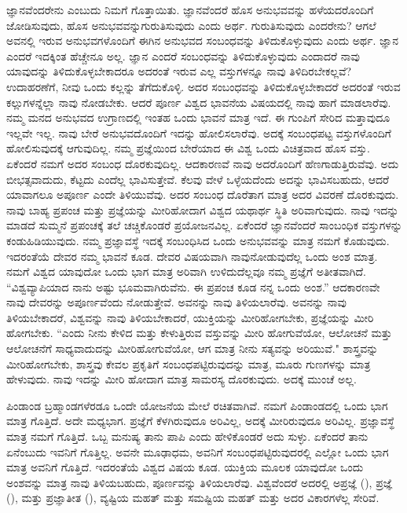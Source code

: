 ಜ್ಞಾನವೆಂದರೇನು ಎಂಬುದು ನಿಮಗೆ ಗೊತ್ತಾಯಿತು. ಜ್ಞಾನವೆಂದರೆ ಹೊಸ ಅನುಭವವನ್ನು ಹಳೆಯದರೊಂದಿಗೆ ಜೋಡಿಸುವುದು, ಹೊಸ ಅನುಭವವನ್ನು\break ಗುರುತಿಸುವುದು ಎಂದು ಅರ್ಥ. ಗುರುತಿಸುವುದು ಎಂದರೇನು? ಆಗಲೆ ಅವನಲ್ಲಿ ಇರುವ ಅನುಭವಗಳೊಂದಿಗೆ ಈಗಿನ ಅನುಭವದ ಸಂಬಂಧವನ್ನು ತಿಳಿದುಕೊಳ್ಳುವುದು ಎಂದು ಅರ್ಥ. ಜ್ಞಾನ ಎಂದರೆ ಇದಕ್ಕಿಂತ ಹೆಚ್ಚೇನೂ ಅಲ್ಲ. ಜ್ಞಾನ ಎಂದರೆ ಸಂಬಂಧವನ್ನು ತಿಳಿದುಕೊಳ್ಳುವುದು ಎಂದಾದರೆ ನಾವು ಯಾವುದನ್ನು ತಿಳಿದುಕೊಳ್ಳಬೇಕಾದರೂ ಅದರಂತೆ ಇರುವ ಎಲ್ಲ ವಸ್ತುಗಳನ್ನೂ ನಾವು ತಿಳಿದಿರಬೇಕಲ್ಲವೆ? ಉದಾಹರಣೆಗೆ, ನೀವು ಒಂದು ಕಲ್ಲನ್ನು ತೆಗೆದುಕೊಳ್ಳಿ. ಅದರ ಸಂಬಂಧವನ್ನು ತಿಳಿದುಕೊಳ್ಳಬೇಕಾದರೆ ಅದರಂತೆ ಇರುವ ಕಲ್ಲುಗಳನ್ನೆಲ್ಲಾ ನಾವು ನೋಡಬೇಕು. ಆದರೆ ಪೂರ್ಣ ವಿಶ್ವದ ಭಾವನೆಯ ವಿಷಯದಲ್ಲಿ ನಾವು ಹಾಗೆ ಮಾಡಲಾರೆವು. ನಮ್ಮ ಮನದ ಅನುಭವದ ಉಗ್ರಾಣದಲ್ಲಿ ಇಂತಹ ಒಂದು ಭಾವನೆ ಮಾತ್ರ ಇದೆ. ಈ ಗುಂಪಿಗೆ ಸೇರಿದ ಮತ್ತಾವುದೂ ಇಲ್ಲವೇ ಇಲ್ಲ. ನಾವು ಬೇರೆ ಅನುಭವದೊಂದಿಗೆ ಇದನ್ನು ಹೋಲಿಸಲಾರೆವು. ಅದಕ್ಕೆ ಸಂಬಂಧಪಟ್ಟ ವಸ್ತುಗಳೊಂದಿಗೆ ಹೋಲಿಸುವುದಕ್ಕೆ ಆಗುವುದಿಲ್ಲ. ನಮ್ಮ ಪ್ರಜ್ಞೆಯಿಂದ ಬೇರೆಯಾದ ಈ ವಿಶ್ವ ಒಂದು ವಿಚಿತ್ರವಾದ ಹೊಸ ವಸ್ತು. ಏಕೆಂದರೆ ನಮಗೆ ಅದರ ಸಂಬಂಧ ದೊರಕುವುದಿಲ್ಲ. ಆದಕಾರಣವೆ ನಾವು ಅದರೊಂದಿಗೆ ಹೆಣಗಾಡುತ್ತಿರುವೆವು. ಅದು ಬೀಭತ್ಸವಾದುದು, ಕೆಟ್ಟದು ಎಂದೆಲ್ಲ ಭಾವಿಸುತ್ತೇವೆ. ಕೆಲವು ವೇಳೆ ಒಳ್ಳೆಯದೆಂದು ಅದನ್ನು ಭಾವಿಸಬಹುದು, ಆದರೆ ಯಾವಾಗಲೂ ಅಪೂರ್ಣ ಎಂದೇ ತಿಳಿಯುವೆವು. ಅದರ ಸಂಬಂಧ ದೊರೆತಾಗ ಮಾತ್ರ ಅದರ ವಿವರಣೆ ದೊರಕುವುದು. ನಾವು ಬಾಹ್ಯ ಪ್ರಪಂಚ ಮತ್ತು ಪ್ರಜ್ಞೆಯನ್ನು ಮೀರಿಹೋದಾಗ ವಿಶ್ವದ ಯಥಾರ್ಥ ಸ್ಥಿತಿ ಅರಿವಾಗುವುದು. ನಾವು ಇದನ್ನು ಮಾಡದೆ ಸುಮ್ಮನೆ ಪ್ರಪಂಚಕ್ಕೆ ತಲೆ ಚಚ್ಚಿಕೊಂಡರೆ ಪ್ರಯೋಜನವಿಲ್ಲ. ಏಕೆಂದರೆ ಜ್ಞಾನವೆಂದರೆ ಸಾಂಬಂಧಿಕ ವಸ್ತುಗಳನ್ನು ಕಂಡುಹಿಡಿಯುವುದು. ನಮ್ಮ ಪ್ರಜ್ಞಾವಸ್ಥೆ ಇದಕ್ಕೆ ಸಂಬಂಧಿಸಿದ ಒಂದು ಅನುಭವವನ್ನು ಮಾತ್ರ ನಮಗೆ ಕೊಡುವುದು. ಇದರಂತೆಯೆ ದೇವರ ನಮ್ಮ ಭಾವನೆ ಕೂಡ. ದೇವರ ವಿಷಯವಾಗಿ ನಾವು\break ನೋಡುವುದೆಲ್ಲ ಒಂದು ಅಂಶ ಮಾತ್ರ. ನಮಗೆ ವಿಶ್ವದ ಯಾವುದೋ ಒಂದು ಭಾಗ ಮಾತ್ರ ಅರಿವಾಗಿ ಉಳಿದುದೆಲ್ಲವೂ ನಮ್ಮ ಪ್ರಜ್ಞೆಗೆ ಅತೀತವಾಗಿದೆ. “ವಿಶ್ವವ್ಯಾಪಿಯಾದ ನಾನು ಅಷ್ಟು ಭೂಮವಾಗಿರುವೆನು. ಈ ಪ್ರಪಂಚ ಕೂಡ ನನ್ನ ಒಂದು ಅಂಶ.'' ಆದಕಾರಣವೇ ನಾವು ದೇವರನ್ನು ಅಪೂರ್ಣವೆಂದು ನೋಡುತ್ತೇವೆ. ಅವನನ್ನು ನಾವು ತಿಳಿಯಲಾರೆವು. ಅವನನ್ನು ನಾವು ತಿಳಿಯಬೇಕಾದರೆ, ವಿಶ್ವವನ್ನು ನಾವು ತಿಳಿಯಬೇಕಾದರೆ, ಯುಕ್ತಿಯನ್ನು ಮೀರಿಹೋಗಬೇಕು, ಪ್ರಜ್ಞೆಯನ್ನು ಮೀರಿ ಹೋಗಬೇಕು. “ಎಂದು ನೀನು ಕೇಳಿದ ಮತ್ತು ಕೇಳುತ್ತಿರುವ ವಸ್ತುವನ್ನು ಮೀರಿ ಹೋಗುವೆಯೋ, ಆಲೋಚನೆ ಮತ್ತು ಆಲೋಚನೆಗೆ ಸಾಧ್ಯವಾದುದನ್ನು ಮೀರಿಹೋಗುವೆಯೋ, ಆಗ ಮಾತ್ರ ನೀನು ಸತ್ಯವನ್ನು ಅರಿಯುವೆ." ಶಾಸ್ತ್ರವನ್ನು ಮೀರಿಹೋಗಬೇಕು, ಶಾಸ್ತ್ರವು ಕೇವಲ ಪ್ರಕೃತಿಗೆ ಸಂಬಂಧಪಟ್ಟಿರುವುದನ್ನು ಮಾತ್ರ, ಮೂರು ಗುಣಗಳನ್ನು ಮಾತ್ರ ಹೇಳುವುದು. ನಾವು ಇದನ್ನು ಮೀರಿ ಹೋದಾಗ ಮಾತ್ರ ಸಾಮರಸ್ಯ ದೊರಕುವುದು. ಅದಕ್ಕೆ ಮುಂಚೆ ಅಲ್ಲ.

ಪಿಂಡಾಂಡ ಬ್ರಹ್ಮಾಂಡಗಳೆರಡೂ ಒಂದೇ ಯೋಜನೆಯ ಮೇಲೆ ರಚಿತವಾಗಿವೆ. ನಮಗೆ ಪಿಂಡಾಂಡದಲ್ಲಿ ಒಂದು ಭಾಗ ಮಾತ್ರ ಗೊತ್ತಿದೆ. ಅದೇ ಮಧ್ಯಭಾಗ. ಪ್ರಜ್ಞೆಗೆ ಕೆಳಗಿರುವುದೂ ಅರಿವಿಲ್ಲ, ಅದಕ್ಕೆ ಮೀರಿರುವುದೂ ಅರಿವಿಲ್ಲ. ಪ್ರಜ್ಞಾವಸ್ಥೆ ಮಾತ್ರ ನಮಗೆ ಗೊತ್ತಿದೆ. ಒಬ್ಬ ಮನುಷ್ಯ ತಾನು ಪಾಪಿ ಎಂದು ಹೇಳಿಕೊಂಡರೆ ಅದು ಸುಳ್ಳು. ಏಕೆಂದರೆ ತಾನು ಏನೆಂಬುದು ಇವನಿಗೆ ಗೊತ್ತಿಲ್ಲ. ಅವನೇ ಮೂಢಾಧಮ, ಅವನಿಗೆ ಸಂಬಂಧಪಟ್ಟಿರುವುದರಲ್ಲಿ ಎಲ್ಲೋ ಒಂದು ಭಾಗ ಮಾತ್ರ ಅವನಿಗೆ ಗೊತ್ತಿದೆ. ಇದರಂತೆಯೆ ವಿಶ್ವದ ವಿಷಯ ಕೂಡ. ಯುಕ್ತಿಯ ಮೂಲಕ ಯಾವುದೋ ಒಂದು ಅಂಶವನ್ನು ಮಾತ್ರ ನಾವು ತಿಳಿಯಬಹುದು, ಪೂರ್ಣವನ್ನು ತಿಳಿಯಲಾರೆವು. ವಿಶ್ವವೆಂದರೆ ಅದರಲ್ಲಿ ಅಪ್ರಜ್ಞೆ (), ಪ್ರಜ್ಞೆ (), ಮತ್ತು ಪ್ರಜ್ಞಾತೀತ (), ವ್ಯಷ್ಟಿಯ ಮಹತ್ ಮತ್ತು ಸಮಷ್ಟಿಯ ಮಹತ್ ಮತ್ತು ಅದರ ವಿಕಾರಗಳೆಲ್ಲ ಸೇರಿವೆ.

